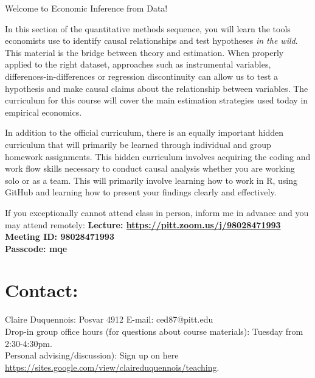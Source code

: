 \documentclass[a4paper, 10pt]{article}
\begin{document}
\begin{center}
Welcome to Economic Inference from Data!\\
\end{center}



In this section of the quantitative methods sequence, you will learn the tools economists use to identify causal relationships and test hypotheses \textit{in the wild}. This material is the bridge between theory and estimation. When properly applied to the right dataset, approaches such as instrumental variables, differences-in-differences or regression discontinuity can allow us to test a hypothesis and make causal claims about the relationship between variables. The curriculum for this course will cover the main estimation strategies used today in empirical economics. 

In addition to the official curriculum, there is an equally important hidden curriculum that will primarily be learned through individual and group homework assignments. This hidden curriculum involves acquiring the coding and work flow skills necessary to conduct causal analysis whether you are working solo or as a team. This will primarily involve learning how to work in R, using GitHub and learning how to present your findings clearly and effectively.


\noindent If you exceptionally cannot attend class in person, inform me in advance and you may attend remotely: 
\noindent\textbf{Lecture: \href{ https://pitt.zoom.us/j/98028471993}{https://pitt.zoom.us/j/98028471993}\\
Meeting ID: 98028471993\\
Passcode: mqe\\}


\section*{Contact:}


\normalsize \noindent Claire Duquennois: Posvar 4912  E-mail: ced87@pitt.edu\\
Drop-in group office hours (for questions about course materials): Tuesday from 2:30-4:30pm. \\
Personal advising/discussion): Sign up on here \href{https://sites.google.com/view/claireduquennois/teaching}{https://sites.google.com/view/claireduquennois/teaching}.
\end{document}
